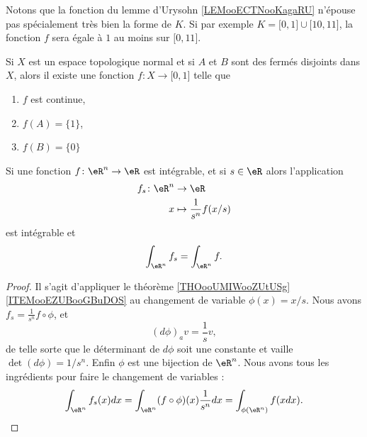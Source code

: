 \begin{normaltext}
	Notons que la fonction du lemme d'Urysohn \ref{LEMooECTNooKagaRU} n'épouse pas spécialement très bien la forme de \( K\). Si par exemple \( K=\mathopen[ 0 , 1 \mathclose]\cup \mathopen[ 10 , 11 \mathclose]\), la fonction \( f\) sera égale à \( 1\) au moins sur \( \mathopen[ 0 , 11 \mathclose]\).
\end{normaltext}

\begin{lemma}	\label{LEMooKMZPooUOwlpt}
	Si \( X\) est un espace topologique normal et si \( A\) et \( B\) sont des fermés disjoints dans \( X\), alors il existe une fonction \(f \colon X\to \mathopen[ 0,1\mathclose]  \) telle que
	\begin{enumerate}
		\item
		      \( f\) est continue,
		\item
		      \( f(A)=\{ 1 \}\),
		\item
		      \( f(B)=\{ 0 \}\)
	\end{enumerate}
\end{lemma}


\begin{lemma}		\label{LEMooGZXYooZqFzyc}
	Si une fonction \(f \colon \eR^n\to \eR  \) est intégrable, et si \( s\in \eR\) alors l'application
	\begin{equation}
		\begin{aligned}
			f_s\colon \eR^n & \to \eR                      \\
			x               & \mapsto \frac{1}{ s^n}f(x/s)
		\end{aligned}
	\end{equation}
	est intégrable et
	\begin{equation}
		\int_{\eR^n}f_s=\int_{\eR^n}f.
	\end{equation}
\end{lemma}

\begin{proof}
	Il s'agit d'appliquer le théorème \ref{THOooUMIWooZUtUSg}\ref{ITEMooEZUBooGBuDOS} au changement de variable \( \phi(x)=x/s\). Nous avons \( f_s=\frac{1}{ s^n}f\circ \phi\), et
	\begin{equation}
		(d\phi)_av=\frac{1}{ s}v,
	\end{equation}
	de telle sorte que le déterminant de \( d\phi\) soit une constante et vaille \( \det(d\phi)=1/s^n\). Enfin \( \phi\) est une bijection de \( \eR^n\). Nous avons tous les ingrédients pour faire le changement de variables :
	\begin{equation}
		\int_{\eR^n}f_s(x)dx=  \int_{\eR^n}(f\circ \phi)(x)\frac{1}{ s^n}dx=\int_{\phi(\eR^n)}f(xdx).
	\end{equation}
\end{proof}

